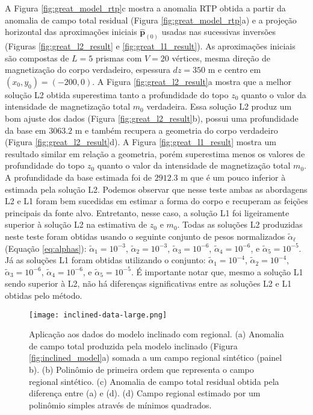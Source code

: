 A Figura \ref{fig:great_model_rtp}c mostra a anomalia RTP obtida a partir da anomalia de campo total residual (Figura \ref{fig:great_model_rtp}a) e 
a projeção horizontal das aproximações iniciais $\hat{\mathbf{p}}_{(0)}$ 
usadas nas sucessivas inversões (Figuras \ref{fig:great_l2_result} e 
\ref{fig:great_l1_result}).
As aproximações iniciais são compostas de $ L= 5$ prismas com $ V = 20 $ vértices, mesma direção de magnetização do corpo verdadeiro, espessura $ dz=350 $ m e centro em $ (x_0, y_0) = (-200, 0) $.
A Figura \ref{fig:great_l2_result}a mostra que a melhor solução L2 obtida superestima tanto a profundidade do topo $z_{0}$ quanto o valor da intensidade de magnetização total $m_{0}$ verdadeira. Essa solução L2 produz um bom ajuste dos dados (Figura \ref{fig:great_l2_result}b), possui uma profundidade da base em $3063.2$ m e também recupera a geometria do corpo verdadeiro (Figura \ref{fig:great_l2_result}d).
A Figura \ref{fig:great_l1_result} mostra um resultado similar em relação a geometria, porém superestima menos os valores de profundidade do topo $z_{0}$ quanto o valor da intensidade de magnetização total $m_{0}$. A profundidade da base estimada foi de $2912.3$ m que é um pouco inferior à estimada pela solução L2.
Podemos observar que nesse teste ambas as abordagens L2 e L1 foram bem sucedidas em estimar a forma do corpo e recuperam as feições principais da fonte alvo. Entretanto, nesse caso, a solução L1 foi ligeiramente superior à solução L2 na estimativa de $ z_0 $ e $ m_0 $.
Todas as soluções L2 produzidas neste teste foram obtidas usando o seguinte conjunto de pesos normalizados $\tilde{\alpha}_{\ell}$ (Equação \ref{eq:alphas}): 
$\tilde{\alpha}_{1} = 10^{-3}$, $\tilde{\alpha}_{2} = 10^{-3}$, 
$\tilde{\alpha}_{3} = 10^{-6}$, $\tilde{\alpha}_{4} = 10^{-6}$, e 
$\tilde{\alpha}_{5} = 10^{-5}$. 
Já as soluções L1 foram obtidas utilizando o conjunto: 
$\tilde{\alpha}_{1} = 10^{-4}$, $\tilde{\alpha}_{2} = 10^{-4}$, 
$\tilde{\alpha}_{3} = 10^{-6}$, $\tilde{\alpha}_{4} = 10^{-6}$, e 
$\tilde{\alpha}_{5} = 10^{-5}$.
É importante notar que, mesmo a solução L1 sendo superior à L2, não há diferenças significativas entre as soluções L2 e L1 obtidas pelo método.

\begin{figure}[!htb]
	\texttt{[image: inclined-data-large.png]}
	\caption{Aplicação aos dados do modelo inclinado com regional. 
		(a) Anomalia de campo total produzida pela modelo inclinado (Figura \ref{fig:inclined_model}a) somada a um campo regional sintético (painel b).
		(b) Polinômio de primeira ordem que representa o campo regional sintético.
		(c) Anomalia de campo total residual obtida pela diferença entre (a) e (d). (d) Campo regional estimado por um polinômio simples através de mínimos quadrados.
	}
	\label{fig:great_data}
\end{figure}
\pagebreak

